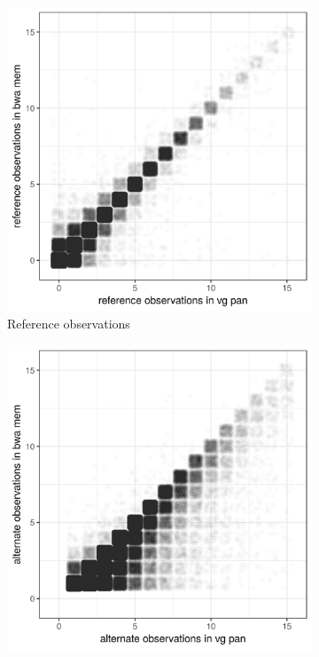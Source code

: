 \begin{figure}[htbp!] 
  \centering
  \begin{subfigure}[t]{0.49\textwidth}
    \includegraphics[width=1.0\textwidth]{Chapter3/Figs/ENCFF486KYD_RO_vg_pan_vs_bwa.png}
    \caption{Reference observations}
    \label{subfig:chip_seq_ref_obs}
  \end{subfigure}
  \begin{subfigure}[t]{0.49\textwidth}
    \includegraphics[width=1.0\textwidth]{Chapter3/Figs/ENCFF486KYD_AO_vg_pan_vs_bwa.png}

\end{subfigure}
\end{figure}
